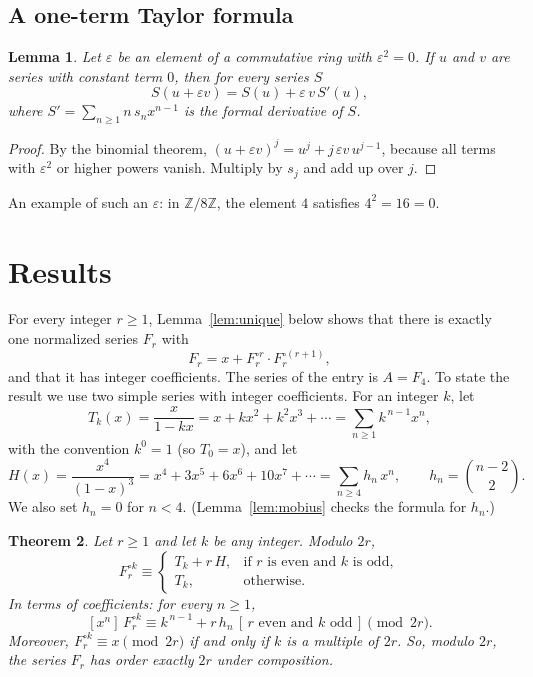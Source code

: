\documentclass[11pt,a4paper]{article}
\newtheorem{theorem}{Theorem}[section]
\newtheorem{lemma}[theorem]{Lemma}
\theoremstyle{definition}
\theoremstyle{remark}
\newcommand{\Z}{\mathbb{Z}}
\newcommand{\coeff}[2]{[x^{#1}]\,#2}
\begin{document}
\subsection{A one-term Taylor formula}
\begin{lemma}\label{lem:taylor}
Let $\varepsilon$ be an element of a commutative ring with $\varepsilon^2=0$. If $u$ and $v$ are series with constant
term $0$, then for every series $S$
\[
S(u+\varepsilon v)=S(u)+\varepsilon\,v\,S'(u),
\]
where $S'=\sum_{n\ge1}n\,s_nx^{n-1}$ is the formal derivative of $S$.
\end{lemma}

\begin{proof}
By the binomial theorem, $(u+\varepsilon v)^j=u^j+j\,\varepsilon v\,u^{j-1}$, because all terms with
$\varepsilon^2$ or higher powers vanish. Multiply by $s_j$ and add up over $j$.
\end{proof}
An example of such an $\varepsilon$: in $\Z/8\Z$, the element $4$ satisfies $4^2=16=0$.

\section{Results}\label{sec:results}

For every integer $r\ge1$, Lemma~\ref{lem:unique} below shows that there is exactly one normalized series $F_r$ with
\begin{equation}\label{eq:family}
F_r=x+F_r^{\circ r}\cdot F_r^{\circ(r+1)},
\end{equation}
and that it has integer coefficients. The series of the entry is $A=F_{4}$. To state the result we use
two simple series with integer coefficients. For an integer $k$, let
\[
T_k(x)=\frac{x}{1-kx}=x+kx^2+k^2x^3+\cdots=\sum_{n\ge1}k^{\,n-1}x^n ,
\]
with the convention $k^0=1$ (so $T_0=x$), and let
\[
H(x)=\frac{x^4}{(1-x)^3}=x^4+3x^5+6x^6+10x^7+\cdots=\sum_{n\ge4}h_n\,x^n,\qquad h_n=\binom{n-2}{2}.
\]
We also set $h_n=0$ for $n<4$. (Lemma~\ref{lem:mobius} checks the formula for $h_n$.)

\begin{theorem}\label{thm:general}
Let $r\ge1$ and let $k$ be any integer. Modulo $2r$,
\[
F_r^{\circ k}\equiv
\begin{cases}
T_k+r\,H, & \text{if $r$ is even and $k$ is odd},\\
T_k, & \text{otherwise}.
\end{cases}
\]
In terms of coefficients: for every $n\ge1$,
\[
\coeff{n}{F_r^{\circ k}}\equiv k^{\,n-1}+r\,h_n\,[\,r\text{ even and }k\text{ odd}\,]\pmod{2r}.
\]
Moreover, $F_r^{\circ k}\equiv x\pmod{2r}$ if and only if $k$ is a multiple of $2r$. So, modulo $2r$, the series $F_r$
has order exactly $2r$ under composition.
\end{theorem}
\end{document}
